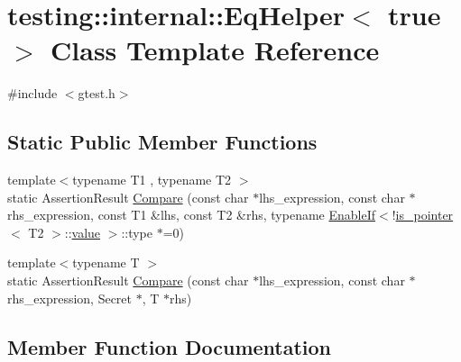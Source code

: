 \hypertarget{classtesting_1_1internal_1_1_eq_helper_3_01true_01_4}{}\section{testing\+::internal\+::Eq\+Helper$<$ true $>$ Class Template Reference}
\label{classtesting_1_1internal_1_1_eq_helper_3_01true_01_4}


{\ttfamily \#include $<$gtest.\+h$>$}

\subsection*{Static Public Member Functions}
\begin{DoxyCompactItemize}
\item 
{\footnotesize template$<$typename T1 , typename T2 $>$ }\\static Assertion\+Result \mbox{\hyperlink{classtesting_1_1internal_1_1_eq_helper_3_01true_01_4_a12c7194b2a210b61f06c912eef484ca6}{Compare}} (const char $\ast$lhs\+\_\+expression, const char $\ast$rhs\+\_\+expression, const T1 \&lhs, const T2 \&rhs, typename \mbox{\hyperlink{structtesting_1_1internal_1_1_enable_if}{Enable\+If}}$<$!\mbox{\hyperlink{structtesting_1_1internal_1_1is__pointer}{is\+\_\+pointer}}$<$ T2 $>$\+::\mbox{\hyperlink{_obj__test_2lib_2googletest-master_2googlemock_2test_2gmock-matchers__test_8cc_a337b8a670efc0b086ad3af163f3121b6}{value}} $>$\+::type $\ast$=0)
\item 
{\footnotesize template$<$typename T $>$ }\\static Assertion\+Result \mbox{\hyperlink{classtesting_1_1internal_1_1_eq_helper_3_01true_01_4_a6f292601a68c8f0d49e6d48bd309b900}{Compare}} (const char $\ast$lhs\+\_\+expression, const char $\ast$rhs\+\_\+expression, Secret $\ast$, T $\ast$rhs)
\end{DoxyCompactItemize}


\subsection{Member Function Documentation}
\mbox{\label{classtesting_1_1internal_1_1_eq_helper_3_01true_01_4_a12c7194b2a210b61f06c912eef484ca6}} 
